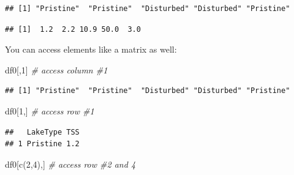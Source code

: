 \documentclass[
]{book}
\newenvironment{Shaded}{\begin{snugshade}}{\end{snugshade}}
\newcommand{\CommentTok}[1]{\textcolor[rgb]{0.56,0.35,0.01}{\textit{#1}}}
\newcommand{\DecValTok}[1]{\textcolor[rgb]{0.00,0.00,0.81}{#1}}
\newcommand{\FunctionTok}[1]{\textcolor[rgb]{0.00,0.00,0.00}{#1}}
\newcommand{\NormalTok}[1]{#1}
\newcommand{\SpecialCharTok}[1]{\textcolor[rgb]{0.00,0.00,0.00}{#1}}
\begin{document}
\begin{Shaded}
\end{Shaded}

\begin{verbatim}
## [1] "Pristine"  "Pristine"  "Disturbed" "Disturbed" "Pristine"
\end{verbatim}

\begin{Shaded}
\end{Shaded}

\begin{verbatim}
## [1]  1.2  2.2 10.9 50.0  3.0
\end{verbatim}

You can access elements like a matrix as well:

\begin{Shaded}
\begin{Highlighting}[]
\NormalTok{df0[,}\DecValTok{1}\NormalTok{] }\CommentTok{\# access column \#1}
\end{Highlighting}
\end{Shaded}

\begin{verbatim}
## [1] "Pristine"  "Pristine"  "Disturbed" "Disturbed" "Pristine"
\end{verbatim}

\begin{Shaded}
\begin{Highlighting}[]
\NormalTok{df0[}\DecValTok{1}\NormalTok{,] }\CommentTok{\# access row \#1}
\end{Highlighting}
\end{Shaded}

\begin{verbatim}
##   LakeType TSS
## 1 Pristine 1.2
\end{verbatim}

\begin{Shaded}
\begin{Highlighting}[]
\NormalTok{df0[}\FunctionTok{c}\NormalTok{(}\DecValTok{2}\NormalTok{,}\DecValTok{4}\NormalTok{),] }\CommentTok{\# access row \#2 and 4}
\end{Highlighting}
\end{Shaded}
\end{document}

